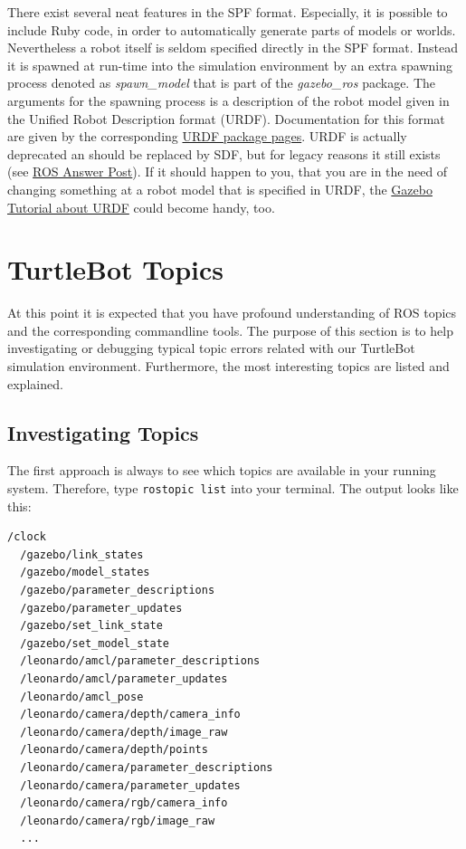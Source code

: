 There exist several neat features in the SPF format. Especially, it is possible to include Ruby code, in order to automatically generate parts of models or worlds. Nevertheless a robot itself is seldom specified directly in the SPF format. Instead it is spawned at run-time into the simulation environment by an extra spawning process denoted as \emph{spawn\_model} that is part of the \emph{gazebo\_ros} package. The arguments for the spawning process is a description of the robot model given in the Unified Robot Description format (URDF). Documentation for this format are given by the corresponding \href{http://wiki.ros.org/urdf/Tutorials}{URDF package pages}. URDF is actually deprecated an should be replaced by SDF, but for legacy reasons it still exists (see \href{http://answers.gazebosim.org/question/62/sdf-vs-urdf-what-should-one-use/}{ROS Answer Post}). If it should happen to you, that you are in the need of changing something at a robot model that is specified in URDF, the \href{http://gazebosim.org/tutorials/?tut=ros_urdf}{Gazebo Tutorial about URDF} could become handy, too.

\section{TurtleBot Topics}
\label{sec:TurtleBotTopics}

At this point it is expected that you have profound understanding of ROS topics and the corresponding commandline tools. The purpose of this section is to help investigating or debugging typical topic errors related with our TurtleBot simulation environment. Furthermore, the most interesting topics are listed and explained.

\subsection{Investigating Topics}
\label{ssec:Investigating Topics}

The first approach is always to see which topics are available in your running system. Therefore, type \verb$rostopic list$ into your terminal. The output looks like this:

\begin{Verbatim}[fontsize=\scriptsize]
  /clock
  /gazebo/link_states
  /gazebo/model_states
  /gazebo/parameter_descriptions
  /gazebo/parameter_updates
  /gazebo/set_link_state
  /gazebo/set_model_state
  /leonardo/amcl/parameter_descriptions
  /leonardo/amcl/parameter_updates
  /leonardo/amcl_pose
  /leonardo/camera/depth/camera_info
  /leonardo/camera/depth/image_raw
  /leonardo/camera/depth/points
  /leonardo/camera/parameter_descriptions
  /leonardo/camera/parameter_updates
  /leonardo/camera/rgb/camera_info
  /leonardo/camera/rgb/image_raw
  ...
\end{Verbatim}

